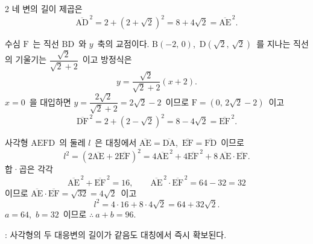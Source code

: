 \documentclass[10pt,fleqn]{article}   %
\begin{document}
\begin{multicols*}{2}
네 변의 길이 제곱은
\[ \overline{\mathrm{AD}}^{\,2} = 2 + (2+\sqrt{2})^2 = 8+4\sqrt{2} = \overline{\mathrm{AE}}^{\,2}. \]

수심 $\mathrm{F}$\ 는 직선 $\mathrm{BD}$\ 와 $y$\ 축의 교점이다. $\mathrm{B}(-2,\,0)$,\ $\mathrm{D}(\sqrt{2},\,\sqrt{2})$\ 를 지나는 직선의 기울기는 $\dfrac{\sqrt{2}}{\sqrt{2}+2}$\ 이고 방정식은
\[ y = \dfrac{\sqrt{2}}{\sqrt{2}+2}(x+2). \]
$x=0$\ 을 대입하면 $y = \dfrac{2\sqrt{2}}{\sqrt{2}+2} = 2\sqrt{2}-2$\ 이므로 $\mathrm{F}=(0,\,2\sqrt{2}-2)$\ 이고
\[ \overline{\mathrm{DF}}^{\,2} = 2 + (2-\sqrt{2})^2 = 8-4\sqrt{2} = \overline{\mathrm{EF}}^{\,2}. \]

사각형 $\mathrm{AEFD}$\ 의 둘레 $l$\ 은 대칭에서 $\overline{\mathrm{AE}}=\overline{\mathrm{DA}}$,\ $\overline{\mathrm{EF}}=\overline{\mathrm{FD}}$\ 이므로
\[ l^{2} = (2\overline{\mathrm{AE}} + 2\overline{\mathrm{EF}})^2 = 4\overline{\mathrm{AE}}^{\,2} + 4\overline{\mathrm{EF}}^{\,2} + 8\,\overline{\mathrm{AE}}\cdot\overline{\mathrm{EF}}. \]
합·곱은 각각
$$\overline{\mathrm{AE}}^{\,2}+\overline{\mathrm{EF}}^{\,2} = 16,\qquad \overline{\mathrm{AE}}^{\,2}\cdot\overline{\mathrm{EF}}^{\,2} = 64-32 = 32$$
이므로 $\overline{\mathrm{AE}}\cdot\overline{\mathrm{EF}}=\sqrt{32}=4\sqrt{2}$\ 이고
\[ l^{2} = 4\cdot 16 + 8\cdot 4\sqrt{2} = 64 + 32\sqrt{2}. \]
$a=64$,\ $b=32$\ 이므로 $\therefore\ a+b = 96$.

\begin{dmcriticalpoint}
: 사각형의 두 대응변의 길이가 같음도 대칭에서 즉시 확보된다.
\end{dmcriticalpoint}

\end{multicols*}
\end{document}
